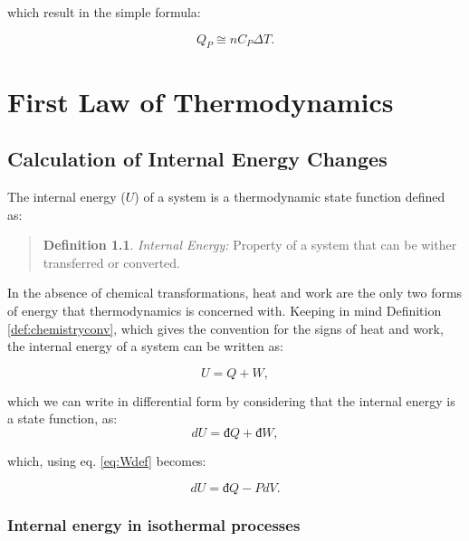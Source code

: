 \documentclass[
]{book}
\theoremstyle{definition}
\newtheorem{definition}{Definition}[chapter]
\theoremstyle{definition}
\theoremstyle{definition}
\theoremstyle{remark}
\begin{document}
which result in the simple formula:

\begin{equation}
  Q_P \cong n C_P \Delta T.
  \label{eq:Cpint}
\end{equation}

\hypertarget{FirstLaw}{%
\chapter{First Law of Thermodynamics}\label{FirstLaw}}

\hypertarget{energyint}{%
\section{Calculation of Internal Energy Changes}\label{energyint}}

The internal energy (\(U\)) of a system is a thermodynamic state function defined as:

\begin{quote}
\begin{definition}
\protect\hypertarget{def:energy}{}{\label{def:energy} }\emph{Internal Energy:} Property of a system that can be wither transferred or converted.
\end{definition}
\end{quote}

In the absence of chemical transformations, heat and work are the only two forms of energy that thermodynamics is concerned with. Keeping in mind Definition \ref{def:chemistryconv}, which gives the convention for the signs of heat and work, the internal energy of a system can be written as:

\begin{equation}
  U = Q + W,
  \label{eq:U}
\end{equation}

which we can write in differential form by considering that the internal energy is a state function, as:
\begin{equation}
  dU = đ Q + đ W,
  \label{eq:dU}
\end{equation}

which, using eq. \eqref{eq:Wdef} becomes:

\begin{equation}
  dU = đ Q - PdV.
  \label{eq:dUpdv}
\end{equation}

\hypertarget{isothermalE}{%
\subsection{Internal energy in isothermal processes}\label{isothermalE}}
\end{document}
